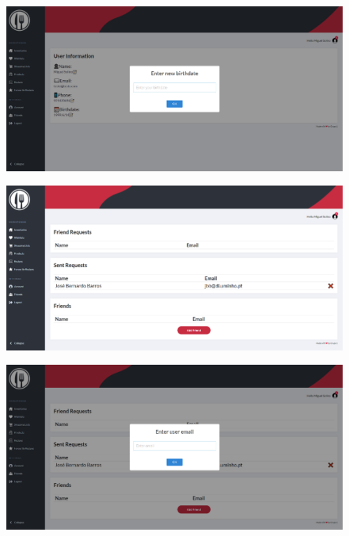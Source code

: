 \documentclass[a4paper]{report}
\begin{document}
    \begin{figure}[H]
        \centering
            \includegraphics[width=\textwidth]{images/produto_final/alterar_nascimento_iventario.png}
    \end{figure}

    \begin{figure}[H]
        \centering
            \includegraphics[width=\textwidth]{images/produto_final/pedido_amigos_enviado.png}
    \end{figure}

    \begin{figure}[H]
        \centering
            \includegraphics[width=\textwidth]{images/produto_final/adicionar_amigo.png}
    \end{figure}
\end{document}
